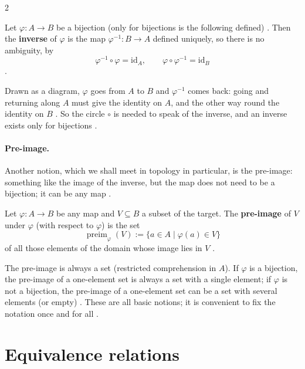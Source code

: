 \begin{paracol}{2}
\begin{definition}\label{def:cl-inverse}
Let $\varphi\colon A\to B$ be a bijection (only for bijections is the following defined) .
Then the \textbf{inverse} of $\varphi$ is the map $\varphi^{-1}\colon B\to A$ defined uniquely, so there is no ambiguity,
by
\[
  \varphi^{-1}\circ\varphi=\mathrm{id}_A,\qquad \varphi\circ\varphi^{-1}=\mathrm{id}_B
\]
.
\end{definition}
Drawn as a diagram, $\varphi$ goes from $A$ to $B$ and $\varphi^{-1}$ comes back: going and returning along $A$ must give
the identity on $A$, and the other way round the identity on $B$ . So the circle $\circ$
is needed to speak of the inverse, and an inverse exists only for bijections .

\paragraph{Pre-image.} Another notion, which we shall meet in topology in particular, is the pre-image: something like
the image of the inverse, but the map does not need to be a bijection; it can be any map .

\begin{definition}\label{def:cl-preimage}
Let $\varphi\colon A\to B$ be any map and $V\subseteq B$ a subset of the target. The \textbf{pre-image} of $V$ under
$\varphi$ (with respect to $\varphi$) is the set
\[
  \operatorname{preim}_\varphi(V):=\{a\in A\mid \varphi(a)\in V\}
\]
of all those elements of the domain whose image lies in $V$ .
\end{definition}
The pre-image is always a set  (restricted comprehension in $A$). If $\varphi$ is a bijection, the
pre-image of a one-element set is always a set with a single element; if $\varphi$ is not a bijection, the pre-image of a
one-element set can be a set with several elements (or empty) . These are all basic notions; it is
convenient to fix the notation once and for all .

\section{Equivalence relations}\label{sec:cl-equiv}


\end{paracol}
